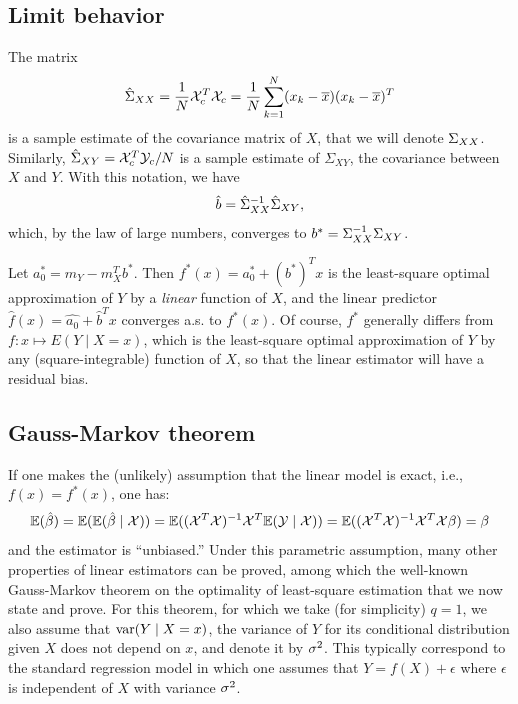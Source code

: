 \subsection{Limit behavior}

The matrix 
\[
\hat\Sigma_{XX} = \frac1N {\mathcal X}_c^T{\mathcal X}_c = \frac1N \sum_{k=1}^N (x_k - \overline{x})(x_k-\overline{x})^T
\]
is a sample estimate of the  covariance matrix of $X$, that we will denote $\Sigma_{XX}$. Similarly, $\hat {\Sigma}_{XY} = {\mathcal X}_c^T{\mathcal Y}_c/N$ is a sample estimate of $\Sigma_{XY}$, the covariance between $X$ and $Y$. With this notation, we have
\[
\hat b = \hat {\Sigma}_{XX}^{-1} \hat{\Sigma}_{XY},
\]
which, by the law of large numbers, converges to $b^* =  \Sigma_{XX}^{-1} \Sigma_{XY}$. 

Let $a_0^*= m_Y - m_X^T b^*$. Then $f^*(x) = a_0^* + (b^{*})^{T}x$ is the least-square optimal approximation of $Y$ by a {\em linear} function of $X$, and
the linear predictor $\hat f(x) = \hat {a_0} + \hat b^{T}x$ converges a.s. to $f^*(x)$. Of course, $f^*$ generally differs from  $f: x\mapsto E(Y\mid X=x)$, which is the least-square optimal approximation of $Y$ by \alert{any} (square-integrable) function of $X$, so that the linear estimator will  have a residual bias. 

\subsection{Gauss-Markov theorem}
If one makes the (unlikely) assumption that the linear model is exact, i.e., $f(x) = f^*(x)$, one has:
\[
\bm{\mathbb E}(\hat {\beta}) = \bm{\mathbb E}(\bm{\mathbb E}(\hat{\beta} \mid {\mathcal X})) = \bm{\mathbb E}(({\mathcal X}^T{\mathcal X})^{-1}{\mathcal X}^T \bm{\mathbb E}({\mathcal Y}\mid {\mathcal X})) = \bm{\mathbb E}(({\mathcal X}^T{\mathcal X})^{-1}{\mathcal X}^T {\mathcal X} \beta) = \beta
\]
and the estimator is ``unbiased.'' Under  this parametric assumption, many other properties of linear estimators  can be proved, among which the well-known Gauss-Markov theorem on the optimality of least-square estimation that we now state and prove. For this theorem, for which we take (for simplicity) $q=1$, we also assume that $\mathrm{var}(Y\mid X=x)$, the variance of $Y$ for its conditional distribution given $X$ does not depend on $x$, and denote it by $\sigma^2$. This typically correspond to the standard regression model in which one assumes that $Y = f(X) + \epsilon$ where $\epsilon$ is independent of $X$ with variance $\sigma^2$.

